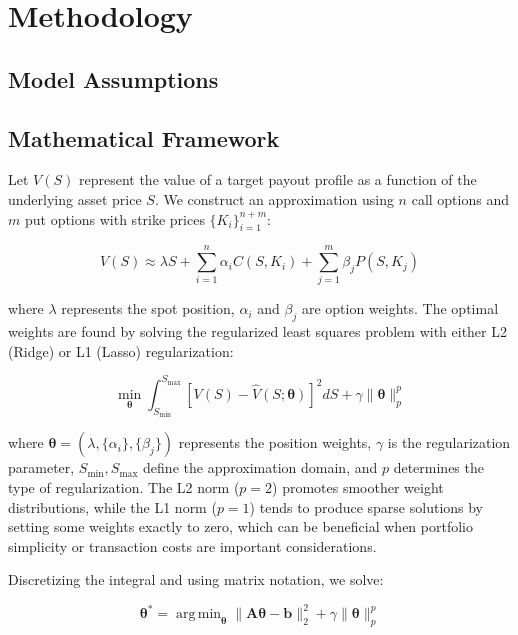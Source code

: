 \documentclass[12pt]{article}
\DeclareMathOperator*{\argmin}{arg\,min}
\begin{document}
\section{Methodology}
\subsection{Model Assumptions}

\subsection{Mathematical Framework}
Let \( V(S) \) represent the value of a target payout profile as a function of the 
underlying asset price \( S \). We construct an approximation using \( n \) call 
options and \( m \) put options with strike prices \( \{K_i\}_{i=1}^{n+m} \):

\begin{equation}
V(S) \approx \lambda S + 
    \sum_{i=1}^{n} \alpha_i C(S, K_i) + 
    \sum_{j=1}^{m} \beta_j P(S, K_j)
\end{equation}

where \( \lambda \) represents the spot position, \( \alpha_i \) and \( \beta_j \) 
are option weights. The optimal weights are found by solving the regularized least 
squares problem with either L2 (Ridge) or L1 (Lasso) regularization:

\begin{equation}
\min_{\boldsymbol{\theta}} 
    \int_{S_{\min}}^{S_{\max}} 
        \left[ V(S) - \hat{V}(S;\boldsymbol{\theta}) \right]^2 dS + 
    \gamma \|\boldsymbol{\theta}\|_p^p
\end{equation}

where \( \boldsymbol{\theta} = (\lambda, \{\alpha_i\}, \{\beta_j\}) \) represents
the position weights, \( \gamma \) is the regularization parameter, 
\( S_{\min}, S_{\max} \) define the approximation domain, and \( p \) determines
the type of regularization. The L2 norm (\(p=2\)) promotes smoother weight 
distributions, while the L1 norm (\(p=1\)) tends to produce sparse solutions by 
setting some weights exactly to zero, which can be beneficial when portfolio 
simplicity or transaction costs are important considerations.

Discretizing the integral and using matrix notation, we solve:

\begin{equation}
\boldsymbol{\theta}^* = 
    \argmin_{\boldsymbol{\theta}} 
        \|\mathbf{A}\boldsymbol{\theta} - \mathbf{b}\|_2^2 + 
        \gamma \|\boldsymbol{\theta}\|_p^p
\end{equation}
\end{document}
